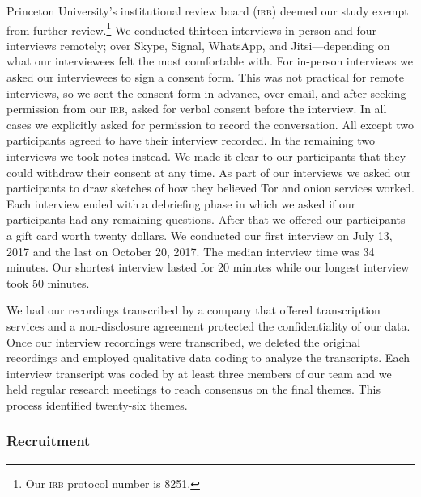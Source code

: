 Princeton University's institutional review board (\textsc{irb}) deemed our
study exempt from further review.\footnote{Our \textsc{irb} protocol number is
8251.}  We conducted thirteen interviews in person and four interviews remotely;
over Skype, Signal, WhatsApp, and Jitsi---depending on what our interviewees
felt the most comfortable with.  For in-person interviews we asked our
interviewees to sign a consent form.  This was not practical for remote
interviews, so we sent the consent form in advance, over email, and after
seeking permission from our \textsc{irb}, asked for verbal consent before the
interview.  In all cases we explicitly asked for permission to record the
conversation.  All except two participants agreed to have their interview
recorded.  In the remaining two interviews we took notes instead.  We made it
clear to our participants that they could withdraw their consent at any time.
As part of our interviews we asked our participants to draw sketches of how they
believed Tor and onion services worked.  Each interview ended with a debriefing
phase in which we asked if our participants had any remaining questions.  After
that we offered our participants a gift card worth twenty dollars.  We conducted
our first interview on July 13, 2017 and the last on October 20, 2017.  The
median interview time was 34 minutes.  Our shortest interview lasted for 20
minutes while our longest interview took 50 minutes.

We had our recordings transcribed by a company that offered transcription
services and a non-disclosure agreement protected the confidentiality of our
data.  Once our interview recordings were transcribed, we deleted the original
recordings and employed qualitative data coding to analyze the transcripts.
Each interview transcript was coded by at least three members of our team and we
held regular research meetings to reach consensus on the final themes.  This
process identified twenty-six themes.

\subsubsection{Recruitment}

